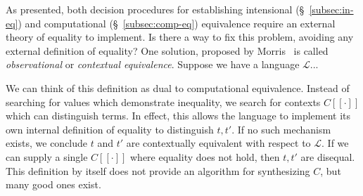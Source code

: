 \documentclass[11pt]{article}
\begin{document}
    As presented, both decision procedures for establishing intensional (\S~\ref{subsec:in-eq}) and computational (\S~\ref{subsec:comp-eq}) equivalence require an external theory of equality to implement. Is there a way to fix this problem, avoiding any external definition of equality? One solution, proposed by Morris~\cite{morris1969lambda} is called \textit{observational} or \textit{contextual equivalence}. Suppose we have a language $\mathcal{L}$...



    We can think of this definition as dual to computational equivalence. Instead of searching for values which demonstrate inequality, we search for contexts $C[\![\cdot]\!]$ which can distinguish terms. In effect, this allows the language to implement its own internal definition of equality to distinguish $t, t'$. If no such mechanism exists, we conclude $t$ and $t'$ are contextually equivalent with respect to $\mathcal{L}$. If we can supply a single $C[\![\cdot]\!]$ where equality does not hold, then $t, t'$ are disequal. This definition by itself does not provide an algorithm for synthesizing $C$, but many good ones exist.


\end{document}
